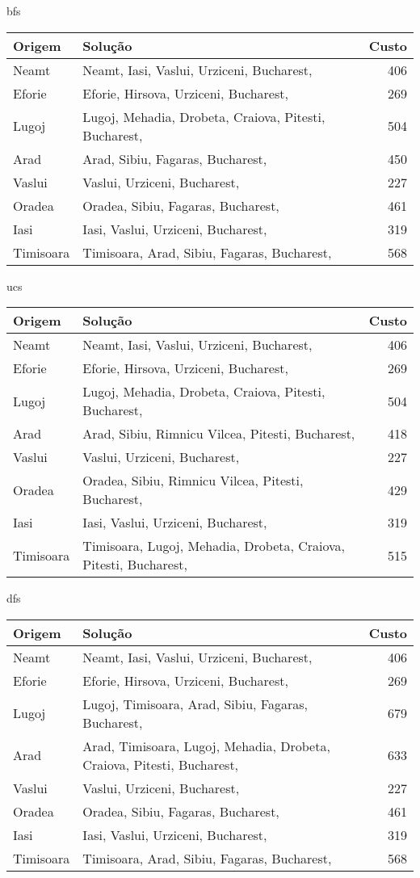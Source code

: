 bfs
\begin{tabular}{llr}
\hline
Origem & Solução & Custo \\
\hline
Neamt & Neamt, Iasi, Vaslui, Urziceni, Bucharest,  & 406 &  \\
\hline
Eforie & Eforie, Hirsova, Urziceni, Bucharest,  & 269 &  \\
\hline
Lugoj & Lugoj, Mehadia, Drobeta, Craiova, Pitesti, Bucharest,  & 504 &  \\
\hline
Arad & Arad, Sibiu, Fagaras, Bucharest,  & 450 &  \\
\hline
Vaslui & Vaslui, Urziceni, Bucharest,  & 227 &  \\
\hline
Oradea & Oradea, Sibiu, Fagaras, Bucharest,  & 461 &  \\
\hline
Iasi & Iasi, Vaslui, Urziceni, Bucharest,  & 319 &  \\
\hline
Timisoara & Timisoara, Arad, Sibiu, Fagaras, Bucharest,  & 568 &  \\
\hline
\end{tabular}
\hline

ucs
\begin{tabular}{llr}
\hline
Origem & Solução & Custo \\
\hline
Neamt & Neamt, Iasi, Vaslui, Urziceni, Bucharest,  & 406 & \\
\hline
Eforie & Eforie, Hirsova, Urziceni, Bucharest,  & 269 & \\
\hline
Lugoj & Lugoj, Mehadia, Drobeta, Craiova, Pitesti, Bucharest,  & 504 & \\
\hline
Arad & Arad, Sibiu, Rimnicu Vilcea, Pitesti, Bucharest,  & 418 & \\
\hline
Vaslui & Vaslui, Urziceni, Bucharest,  & 227 \\
\hline
Oradea & Oradea, Sibiu, Rimnicu Vilcea, Pitesti, Bucharest,  & 429 & \\
\hline
Iasi & Iasi, Vaslui, Urziceni, Bucharest,  & 319 & \\
\hline
Timisoara & Timisoara, Lugoj, Mehadia, Drobeta, Craiova, Pitesti, Bucharest,  & 515 & \\
\hline
\end{tabular}
\hline

dfs
\begin{tabular}{llr}
\hline
Origem & Solução & Custo \\
\hline
Neamt & Neamt, Iasi, Vaslui, Urziceni, Bucharest,  & 406 & \\
\hline
Eforie & Eforie, Hirsova, Urziceni, Bucharest,  & 269 & \\
\hline
Lugoj & Lugoj, Timisoara, Arad, Sibiu, Fagaras, Bucharest,  & 679 & \\
\hline
Arad & Arad, Timisoara, Lugoj, Mehadia, Drobeta, Craiova, Pitesti, Bucharest,  & 633 & \\
\hline
Vaslui & Vaslui, Urziceni, Bucharest,  & 227 & \\
\hline
Oradea & Oradea, Sibiu, Fagaras, Bucharest,  & 461 & \\
\hline
Iasi & Iasi, Vaslui, Urziceni, Bucharest,  & 319 & \\
\hline
Timisoara & Timisoara, Arad, Sibiu, Fagaras, Bucharest,  & 568 & \\
\hline
\end{tabular}
\hline

